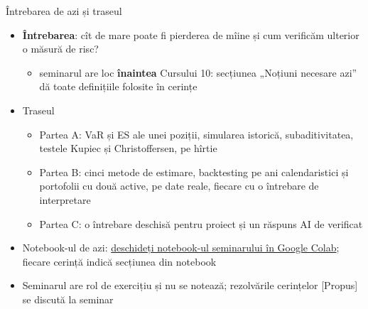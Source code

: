 \begin{frame}{Întrebarea de azi și traseul}
\itemsize{\small}
\begin{itemize}
    \item \textbf{Întrebarea}: cît de mare poate fi pierderea de mîine și cum verificăm ulterior o măsură de risc?
    \begin{itemize}
        \item seminarul are loc \textbf{înaintea} Cursului 10: secțiunea „Noțiuni necesare azi” dă toate definițiile folosite în cerințe
    \end{itemize}
    \item Traseul
    \begin{itemize}
        \item Partea A: VaR și ES ale unei poziții, simularea istorică, subaditivitatea, testele Kupiec și Christoffersen, pe hîrtie
        \item Partea B: cinci metode de estimare, backtesting pe ani calendaristici și portofolii cu două active, pe date reale, fiecare cu o întrebare de interpretare
        \item Partea C: o întrebare deschisă pentru proiect și un răspuns AI de verificat
    \end{itemize}
    \item Notebook-ul de azi: \href{\nb}{deschideți notebook-ul seminarului în Google Colab}; fiecare cerință indică secțiunea din notebook
    \item Seminarul are rol de exercițiu și nu se notează; rezolvările cerințelor [Propus] se discută la seminar
\end{itemize}
\end{frame}

